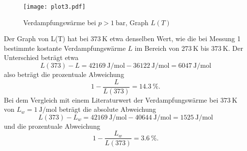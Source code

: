 \newpage

\begin{figure}[h]
  \centering
  \texttt{[image: plot3.pdf]}
  \caption{Verdampfungswärme bei $p > \SI{1}{\bar}$, Graph $L(T)$}
  \label{fig:L}
\end{figure}

Der Graph von L(T) hat bei $\SI{373}{\kelvin}$ etwa denselben Wert, wie die
bei Messung 1 bestimmte kostante Verdampfungswärme $L$ im Bereich von
$\SI{273}{\kelvin}$ bis $\SI{373}{\kelvin}$.
Der Unterschied beträgt etwa
\begin{equation}
  L(373) - L = \SI{42169}{\joule\per\mol} - \SI{36122}{\joule\per\mol} =
  \SI{6047}{\joule\per\mol}
\end{equation}
also beträgt die prozentuale Abweichung
\begin{equation}
  1 - \frac{L}{L(373)} = \SI{14.3}{\percent} .
\end{equation}
Bei dem Vergleich mit einem Literaturwert der
Verdampfungswärme\cite{verdampfungswärme}
bei
$\SI{373}{\kelvin}$ von $L_w = \SI{1}{\joule\per\mol}$ beträgt die absolute
Abweichung
\begin{equation}
  L(373) - L_w = \SI{42169}{\joule\per\mol} - \SI{40644}{\joule\per\mol} =
  \SI{1525}{\joule\per\mol}
\end{equation}
und die prozentuale Abweichung
\begin{equation}
  1 - \frac{L_w}{L(373)} = \SI{3.6}{\percent} .
\end{equation}

\newpage
